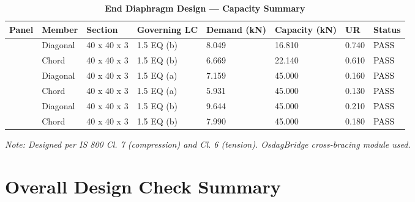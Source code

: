 \documentclass[12pt,a4paper]{report}
\numberwithin{table}{chapter}
\numberwithin{figure}{chapter}
\begin{document}
\vspace{1em}

\begin{longtable}{|C{2.0cm}|L{1.8cm}|C{2.2cm}|C{3.0cm}|C{1.8cm}|C{1.8cm}|C{1.2cm}|C{1.8cm}|}
\caption{\textbf{End Diaphragm Design --- Capacity Summary}}
\hline
\textbf{Panel} & \textbf{Member} & \textbf{Section} & \textbf{Governing LC} & \textbf{Demand (kN)} & \textbf{Capacity (kN)} & \textbf{UR} & \textbf{Status} \\[6pt]
\hline
{} & Diagonal & 40 x 40 x 3 & 1.5 EQ (b) & 8.049 & 16.810 & 0.740 & \textcolor{black}{PASS} \\[6pt]
 & Chord & 40 x 40 x 3 & 1.5 EQ (b) & 6.669 & 22.140 & 0.610 & \textcolor{black}{PASS} \\[6pt]
\hline
{} & Diagonal & 40 x 40 x 3 & 1.5 EQ (a) & 7.159 & 45.000 & 0.160 & \textcolor{black}{PASS} \\[6pt]
 & Chord & 40 x 40 x 3 & 1.5 EQ (a) & 5.931 & 45.000 & 0.130 & \textcolor{black}{PASS} \\[6pt]
\hline
{} & Diagonal & 40 x 40 x 3 & 1.5 EQ (b) & 9.644 & 45.000 & 0.210 & \textcolor{black}{PASS} \\[6pt]
 & Chord & 40 x 40 x 3 & 1.5 EQ (b) & 7.990 & 45.000 & 0.180 & \textcolor{black}{PASS} \\[6pt]
\hline
\end{longtable}
\noindent\textit{Note: Designed per IS 800 Cl. 7 (compression) and Cl. 6 (tension). OsdagBridge cross-bracing module used.}

\section{Overall Design Check Summary}
\label{sec:overall-summary}
\end{document}
